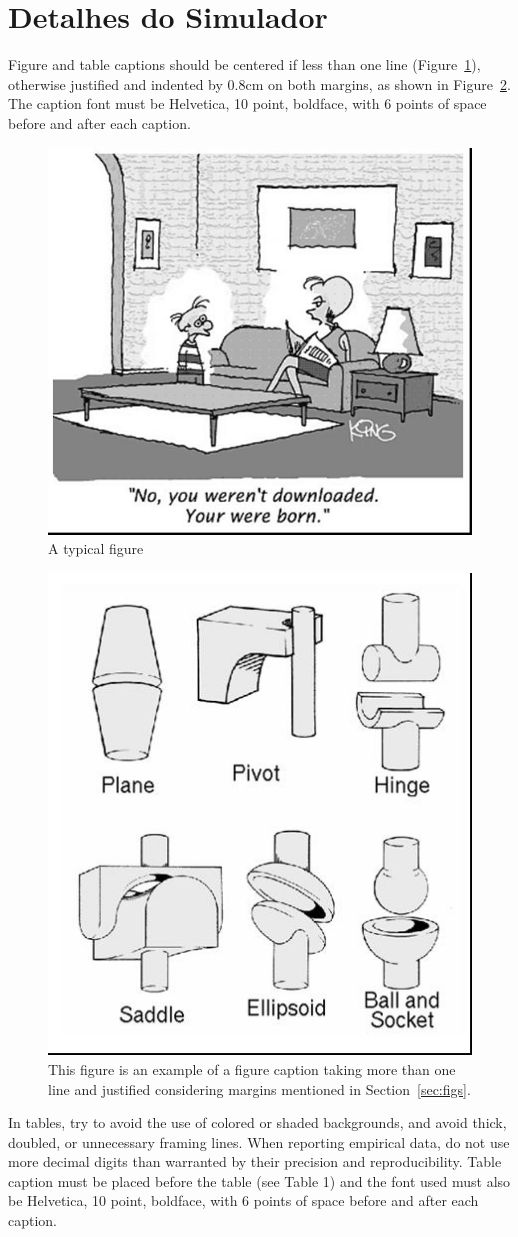 \documentclass[12pt]{article}
\begin{document}
\section{Detalhes do Simulador}


Figure and table captions should be centered if less than one line
(Figure~\ref{fig:exampleFig1}), otherwise justified and indented by 0.8cm on
both margins, as shown in Figure~\ref{fig:exampleFig2}. The caption font must
be Helvetica, 10 point, boldface, with 6 points of space before and after each
caption.

\begin{figure}[ht]
\centering
\includegraphics[width=.5\textwidth]{fig1.jpg}
\caption{A typical figure}
\label{fig:exampleFig1}
\end{figure}

\begin{figure}[ht]
\centering
\includegraphics[width=.3\textwidth]{fig2.jpg}
\caption{This figure is an example of a figure caption taking more than one
  line and justified considering margins mentioned in Section~\ref{sec:figs}.}
\label{fig:exampleFig2}
\end{figure}

In tables, try to avoid the use of colored or shaded backgrounds, and avoid
thick, doubled, or unnecessary framing lines. When reporting empirical data,
do not use more decimal digits than warranted by their precision and
reproducibility. Table caption must be placed before the table (see Table 1)
and the font used must also be Helvetica, 10 point, boldface, with 6 points of
space before and after each caption.
\end{document}
